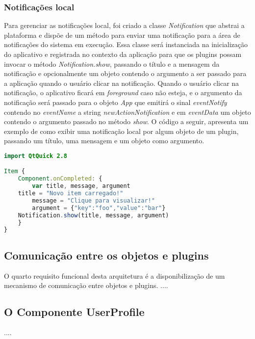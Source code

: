 \subsubsection{Notificações local}
Para gerenciar as notificações local, foi criado a classe \textit{Notification} que abstrai a plataforma e dispõe de um método para enviar uma notificação para a área de notificações do sistema em execução. Essa classe será instanciada na inicialização do aplicativo e registrada no contexto da aplicação para que os plugins possam invocar o método \textit{Notification.show}, passando o título e a mensagem da notificação e opcionalmente um objeto contendo o argumento a ser passado para a aplicação quando o usuário clicar na notificação. Quando o usuário clicar na notificação, o aplicativo ficará em \textit{foreground} caso não esteja, e o argumento da notificação será passado para o objeto \textit{App} que emitirá o sinal \textit{eventNotify} contendo no \textit{eventName} a string \textit{newActionNotification} e em \textit{eventData} um objeto contendo o argumento passado no método \textit{show}. O código a seguir, apresenta um exemplo de como exibir uma notificação local por algum objeto de um plugin, passando um título, uma mensagem e um objeto como argumento.

\begin{center}
\begin{lstlisting}[language=qml]
import QtQuick 2.8

Item {
    Component.onCompleted: {
    	var title, message, argument
	title = "Novo item carregado!"
    	message = "Clique para visualizar!"
    	argument = {"key":"foo","value":"bar"}
	Notification.show(title, message, argument)
    }
}
\end{lstlisting}
\end{center}


\subsection{Comunicação entre os objetos e plugins}
O quarto requisito funcional desta arquitetura é a disponibilização de um mecanismo de comunicação entre objetos e plugins.
....


\subsection{O Componente UserProfile}\label{sec:solucao-desenvolvida}
....



